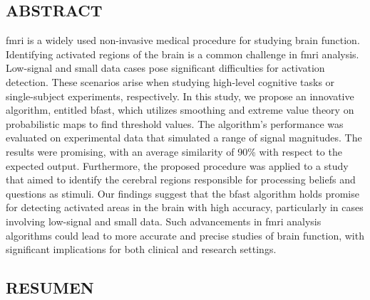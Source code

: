 \vspace*{0.5in}
\begin{center}
\section*{ABSTRACT}
\end{center}

\acrfull{fmri} is a widely used non-invasive medical procedure for studying brain function. Identifying activated regions of the brain is a common challenge in \acrshort{fmri} analysis. Low-signal and small data cases pose significant difficulties for activation detection. These scenarios arise when studying high-level cognitive tasks or single-subject experiments, respectively. In this study, we propose an innovative algorithm, entitled \acrfull{bfast}, which utilizes smoothing and extreme value theory on probabilistic maps to find threshold values. The algorithm's performance was evaluated on experimental data that simulated a range of signal magnitudes. The results were promising, with an average similarity of 90\% with respect to the expected output. Furthermore, the proposed procedure was applied to a study that aimed to identify the cerebral regions responsible for processing beliefs and questions as stimuli. Our findings suggest that the \acrshort{bfast} algorithm holds promise for detecting activated areas in the brain with high accuracy, particularly in cases involving low-signal and small data. Such advancements in \acrshort{fmri} analysis algorithms could lead to more accurate and precise studies of brain function, with significant implications for both clinical and research settings.

\newpage

\vspace*{0.5in}
\begin{center}
\section*{RESUMEN}
\end{center}

